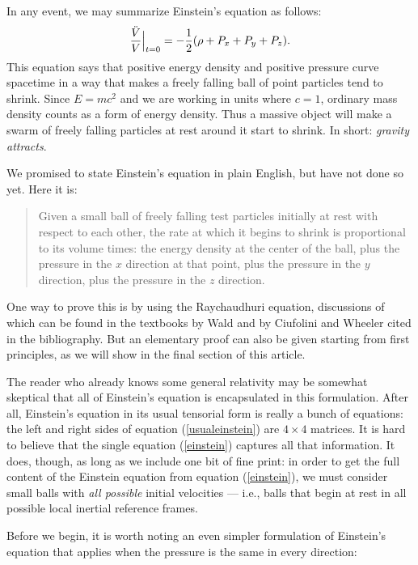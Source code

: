 In any event, we may summarize
Einstein's equation as follows:
\begin{equation}   {\ddot V\over V} \Bigr|_{t = 0} 
= -{1\over 2} (\rho + P_x + P_y + P_z). \label{einstein} \end{equation}
This equation says that positive energy density and positive pressure
curve spacetime in a way that makes a freely falling ball of point
particles tend to shrink.  Since $E = mc^2$ and we are working in units
where $c = 1$, ordinary mass density counts as a form of energy density.
Thus a massive object will make a swarm of freely falling particles at
rest around it start to shrink.  In short: {\it gravity attracts}.

We promised to state Einstein's equation in plain English, but have
not done so yet.  Here it is:

\begin{quote}
Given a small ball of freely falling test particles initially at rest
with respect to each other, the rate at which it begins to shrink is
proportional to its volume times: the energy density at the center of
the ball, plus the pressure in the $x$ direction at that point, plus
the pressure in the $y$ direction, plus the pressure in the $z$
direction.
\end{quote}

One way to prove this is by using the Raychaudhuri equation, discussions
of which can be found in the textbooks by Wald and by Ciufolini
and Wheeler cited in the bibliography.  But an elementary
proof can also be given starting from first principles,
as we will show in the final section of this article.

The reader who already knows some
general relativity may be somewhat skeptical that all 
of Einstein's equation is encapsulated in this formulation.  After
all, Einstein's equation in its usual tensorial form is really
a bunch of equations: the left and right sides of equation
(\ref{usualeinstein}) are $4\times 4$ matrices.  It is hard to believe
that the single equation (\ref{einstein}) captures all that
information.  It does, though, as long as we include one bit of fine
print: in order to get the full content of the Einstein equation from
equation (\ref{einstein}), we must consider small balls with 
{\it all possible} initial velocities --- i.e., balls that begin
at rest in all possible local inertial reference frames.

Before we begin, it is worth noting an even simpler formulation
of Einstein's equation that applies when the pressure is the
same in every direction:

